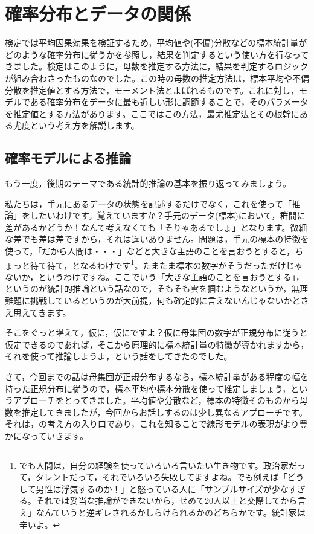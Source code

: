 \documentclass{ltjsarticle}
\begin{document}
\chapter{確率分布とデータの関係}
\label{chapter24}
検定では平均因果効果を検証するため，平均値や(不偏)分散などの標本統計量がどのような確率分布に従うかを参照し，結果を判定するという使い方を行なってきました。検定はこのように，母数を推定する方法に，結果を判定するロジックが組み合わさったものなのでした。この時の母数の推定方法は，標本平均や不偏分散を推定値とする方法で，モーメント法とよばれるものです。これに対し，モデルである確率分布をデータに最も近しい形に調節することで，そのパラメータを推定値とする方法があります。ここではこの方法，最尤推定法とその根幹にある尤度という考え方を解説します。
\section{確率モデルによる推論}
もう一度，後期のテーマである統計的推論の基本を振り返ってみましょう。

私たちは，手元にあるデータの状態を記述するだけでなく，これを使って「推論」をしたいわけです。覚えていますか？手元のデータ(標本)において，群間に差があるかどうか！なんて考えなくても「そりゃあるでしょ」となります。微細な差でも差は差ですから，それは違いありません。問題は，手元の標本の特徴を使って，「だから人間は・・・」などと大きな主語のことを言おうとすると，ちょっと待て待て，となるわけです\footnote{でも人間は，自分の経験を使っていろいろ言いたい生き物です。政治家だって，タレントだって，それでいろいろ失敗してますよね。でも例えば「どうして男性は浮気するのか！」と怒っている人に「サンプルサイズが少なすぎる。それでは妥当な推論ができないから，せめて20人以上と交際してから言え」なんていうと逆ギレされるかしらけられるかのどちらかです。統計家は辛いよ。}。たまたま標本の数字がそうだっただけじゃないか，というわけですね。ここでいう「大きな主語のことを言おうとする」，というのが統計的推論という話なので，そもそも雲を掴むようなというか，無理難題に挑戦しているというのが大前提，何も確定的に言えないんじゃないかとさえ思えてきます。

そこをぐっと堪えて，仮に，仮にですよ？仮に母集団の数字が正規分布に従うと仮定できるのであれば，そこから原理的に標本統計量の特徴が導かれますから，それを使って推論しようよ，という話をしてきたのでした。

さて，今回までの話は母集団が正規分布するなら，標本統計量がある程度の幅を持った正規分布に従うので，標本平均や標本分散を使って推定しましょう，というアプローチをとってきました。平均値や分散など，標本の特徴そのものから母数を推定してきましたが，今回からお話しするのは少し異なるアプローチです。それは，の考え方の入り口であり，これを知ることで線形モデルの表現がより豊かになっていきます。
\end{document}

